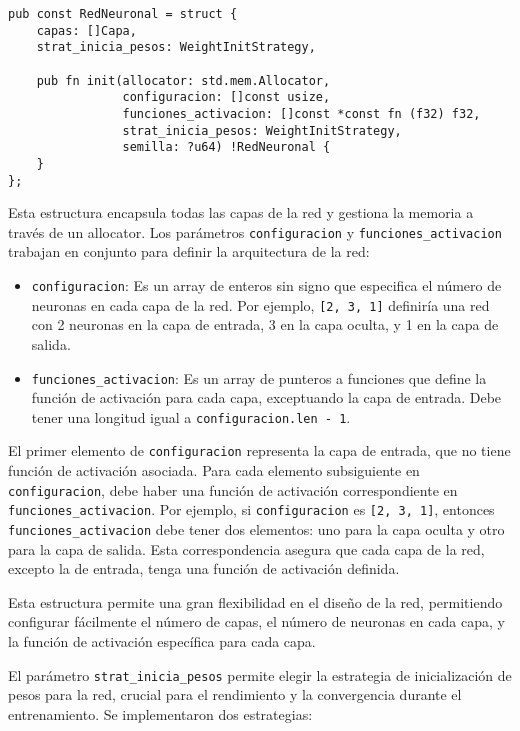 \documentclass[twocolumn]{article}
\begin{document}
\begin{lstlisting}[style=customcode]
pub const RedNeuronal = struct {
    capas: []Capa,
    strat_inicia_pesos: WeightInitStrategy,

    pub fn init(allocator: std.mem.Allocator,
                configuracion: []const usize,
                funciones_activacion: []const *const fn (f32) f32,
                strat_inicia_pesos: WeightInitStrategy,
                semilla: ?u64) !RedNeuronal {
    }
};
\end{lstlisting}

Esta estructura encapsula todas las capas de la red y gestiona la memoria a través de un allocator. Los parámetros \texttt{configuracion} y \texttt{funciones\_activacion} trabajan en conjunto para definir la arquitectura de la red:

\begin{itemize}
    \item \texttt{configuracion}: Es un array de enteros sin signo que especifica el número de neuronas en cada capa de la red. Por ejemplo, \texttt{[2, 3, 1]} definiría una red con 2 neuronas en la capa de entrada, 3 en la capa oculta, y 1 en la capa de salida.

    \item \texttt{funciones\_activacion}: Es un array de punteros a funciones que define la función de activación para cada capa, exceptuando la capa de entrada. Debe tener una longitud igual a \texttt{configuracion.len - 1}.
\end{itemize}

El primer elemento de \texttt{configuracion} representa la capa de entrada, que no tiene función de activación asociada. Para cada elemento subsiguiente en \texttt{configuracion}, debe haber una función de activación correspondiente en \texttt{funciones\_activacion}. Por ejemplo, si \texttt{configuracion} es \texttt{[2, 3, 1]}, entonces \texttt{funciones\_activacion} debe tener dos elementos: uno para la capa oculta y otro para la capa de salida. Esta correspondencia asegura que cada capa de la red, excepto la de entrada, tenga una función de activación definida.

Esta estructura permite una gran flexibilidad en el diseño de la red, permitiendo configurar fácilmente el número de capas, el número de neuronas en cada capa, y la función de activación específica para cada capa.

El parámetro \texttt{strat\_inicia\_pesos} permite elegir la estrategia de inicialización de pesos para la red, crucial para el rendimiento y la convergencia durante el entrenamiento. Se implementaron dos estrategias:
\end{document}
